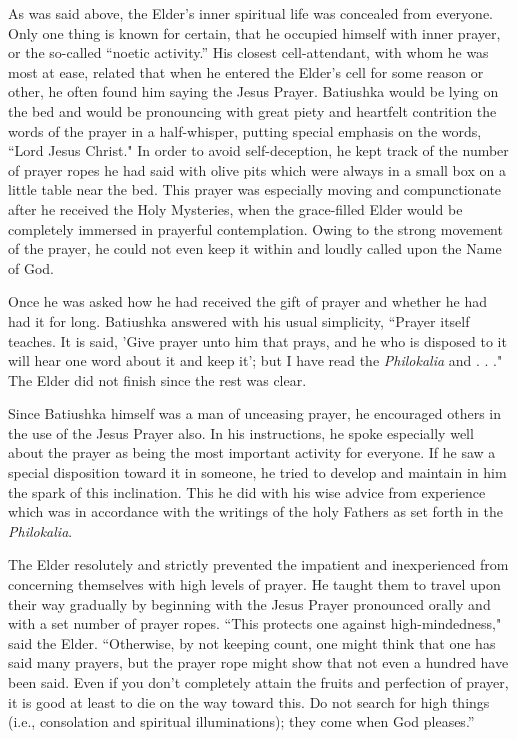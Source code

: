 As was said above, the Elder's inner spiritual life was concealed from everyone. Only one thing is known for certain, that he occupied himself with inner prayer, or the so-called “noetic activity.” His closest cell-attendant, with whom he was most at ease, related that when he entered the Elder's cell for some reason or other, he often found him saying the Jesus Prayer. Batiushka would be lying on the bed and would be pronouncing with great piety and heartfelt contrition the words of the prayer in a half-whisper, putting special emphasis on the words, “Lord Jesus Christ." In order to avoid self-deception, he kept track of the number of prayer ropes he had said with olive pits which were always in a small box on a little table near the bed. This prayer was especially moving and compunctionate after he received the Holy Mysteries, when the grace-filled Elder would be completely immersed in prayerful contemplation. Owing to the strong movement of the prayer, he could not even keep it within and loudly called upon the Name of God.

Once he was asked how he had received the gift of prayer and whether he had had it for long. Batiushka answered with his usual simplicity, “Prayer itself teaches. It is said, 'Give prayer unto him that prays, and he who is disposed to it will hear one word about it and keep it’; but I have read the \textit{Philokalia} and . . ." The Elder did not finish since the rest was clear.

Since Batiushka himself was a man of unceasing prayer, he encouraged others in the use of the Jesus Prayer also. In his instructions, he spoke especially well about the prayer as being the most important activity for everyone. If he saw a special disposition toward it in someone, he tried to develop and maintain in him the spark of this inclination. This he did with his wise advice from experience which was in accordance with the writings of the holy Fathers as set forth in the \textit{Philokalia}.

The Elder resolutely and strictly prevented the impatient and inexperienced from concerning themselves with high levels of prayer. He taught them to travel upon their way gradually by beginning with the Jesus Prayer pronounced orally and with a set number of prayer ropes. “This protects one against high-mindedness," said the Elder. “Otherwise, by not keeping count, one might think that one has said many prayers, but the prayer rope might show that not even a hundred have been said. Even if you don't completely attain the fruits and perfection of prayer, it is good at least to die on the way toward this. Do not search for high things (i.e., consolation and spiritual illuminations); they come when God pleases.”

